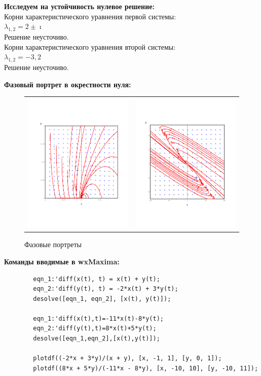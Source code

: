 \documentclass[a4paper, 12pt, oneside]{scrartcl}
\begin{document}
\begin{enumerate}
		\textbf{Исследуем на устойчивость нулевое решение: } \\
		Корни характеристического уравнения первой системы:\\
		$\lambda_{1,2}=2\pm\imath $\\
		Решение неусточиво. \\ 
		Корни характеристического уравнения второй системы:\\
		$\lambda_{1,2} = {-3, 2}$\\
		Решение неусточиво.
		
		\textbf{Фазовый портрет в окрестности нуля: }
	\begin{figure}[h]
		\centering
		\begin{tabular}{cc}
		\includegraphics[width=0.3\linewidth]{p1}
		&
		\includegraphics[width=0.3\linewidth]{p2}
		\end{tabular}
		\caption{Фазовые портреты}
		\label{fig:mpr}
	\end{figure}
		
		\pagebreak

		\textbf{Команды вводимые в wxMaxima: }
		\begin{verbatim}
		eqn_1:'diff(x(t), t) = x(t) + y(t);
		eqn_2:'diff(y(t), t) = -2*x(t) + 3*y(t);
		desolve([eqn_1, eqn_2], [x(t), y(t)]);

		eqn_1:'diff(x(t),t)=-11*x(t)-8*y(t);
		eqn_2:'diff(y(t),t)=8*x(t)+5*y(t);
		desolve([eqn_1,eqn_2],[x(t),y(t)]);
	
		plotdf((-2*x + 3*y)/(x + y), [x, -1, 1], [y, 0, 1]);
		plotdf((8*x + 5*y)/(-11*x - 8*y), [x, -10, 10], [y, -10, 11]);
		\end{verbatim} 
		

\end{enumerate}
\end{document}
